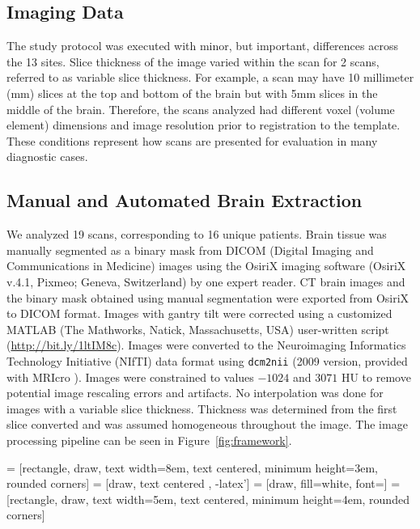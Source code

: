 \documentclass{elsarticle}\usepackage[]{graphicx}\usepackage[]{color}
\begin{document}
\subsection{Imaging Data}
The study protocol was executed with minor, but important, differences across the 13 sites.  
Slice thickness of the image varied within the scan for 2 scans, referred to as variable slice thickness. For example, a scan may have 10 millimeter (mm) slices at the top and bottom of the brain but with 5mm slices in the middle of the brain.  Therefore, the scans analyzed had different voxel (volume element) dimensions and image resolution prior to registration to the template.  These conditions represent how scans are presented for evaluation in many diagnostic cases.


\subsection{Manual and Automated Brain Extraction}
We analyzed 19 scans, corresponding to 16 unique patients.  Brain tissue was manually segmented as a binary mask from DICOM (Digital Imaging and Communications in Medicine) images using the OsiriX imaging software (OsiriX v.4.1, Pixmeo; Geneva, Switzerland) by one expert reader. 
CT brain images and the binary mask obtained using manual segmentation were exported from OsiriX to DICOM format.  Images with gantry tilt were corrected using a customized MATLAB (The Mathworks, Natick, Massachusetts, USA) user-written script (\url{http://bit.ly/1ltIM8c}). 
Images were converted to the Neuroimaging Informatics Technology Initiative (NIfTI) data format using \verb|dcm2nii| (2009 version, provided with MRIcro \citep{rorden_stereotaxic_2000}).  Images were constrained to values $-1024$ and $3071$ HU to remove potential image rescaling errors and artifacts.  No interpolation was done for images with a variable slice thickness. Thickness was determined from the first slice converted and was assumed homogeneous throughout the image.  The image processing pipeline can be seen in Figure~\ref{fig:framework}.



 = [rectangle, draw, text width=8em, text centered, minimum height=3em, rounded corners]
 = [draw, text centered , -latex']
 = [draw, fill=white, font=\tiny ]
 = [rectangle, draw, text width=5em, text centered, minimum height=4em, rounded corners]    
\end{document}
